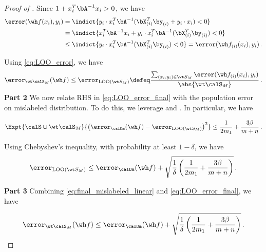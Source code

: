 \begin{proof}[Proof of ]
    Since $1 + x_i^T \bA^{-1} x_i > 0$, we have 
    \begin{align}
        \error(\wh f(x_i), y_i ) &= \indict{ y_i \cdot x_i^T \bA^{-1} (\bXX{i}^T\byy{i} + y_i \cdot x_i) < 0 } \\
        &= \indict{ x_i^T \bA^{-1} x_i +  y_i \cdot x_i^T \bA^{-1} (\bXX{i}^T\byy{i}) < 0 } \\
        &\le \indict{ y_i \cdot x_i^T \bA^{-1} (\bXX{i}^T\byy{i}) < 0 } = \error(\ff{i}(x_i), y_i ) \,.\label{eq:LOO_error}
    \end{align}

    Using \eqref{eq:LOO_error}, we have 
    \begin{align}
        \error_{\wt \calS_M } (\wh f) \le \error_{\text{LOO} (\wt S_M)} \defeq \frac{\sum_{(x_i, y_i) \in \wt S_M} \error(\ff{i}(x_i), y_i ) }{\abs{\wt \calS_M}}\label{eq:LOO_error_final} \,.
    \end{align}
    \textbf{Part 2 {}{}} We now relate RHS in \eqref{eq:LOO_error_final} 
    with the population error on mislabeled distribution. 
    To do this, we leverage  
    and . 
    In particular, we have 

    \begin{align}
        \Expt{\calS \cup \wt \calS_M }{ \left(\error_{\calDm}(\wh f) - \error_{\text{LOO} (\wt S_M)}\right)^2 } \le \frac{1}{2m_1} + \frac{3\beta}{m+n} \,.
    \end{align}

    Using Chebyshev's inequality, with probability at least $1-\delta$, we have 
    \begin{align}
        \error_{\text{LOO} (\wt S_M)} \le  \error_{\calDm}(\wh f)   + \sqrt{\frac{1}{\delta}\left(\frac{1}{2m_1} +\frac{3\beta}{m+n} \right)} \,. \label{eq:final_mislabeled_linear}
    \end{align}
    

    \textbf{Part 3 {}{}} Combining \eqref{eq:final_mislabeled_linear} and \eqref{eq:LOO_error_final}, we have 

    \begin{align}
        \error_{\wt \calS_M } (\wh f) \le \error_{\calDm}(\wh f)   + \sqrt{\frac{1}{\delta}\left(\frac{1}{2m_1} +\frac{3\beta}{m+n} \right)} \,. \label{eq:linear_parallel_lem1}
    \end{align}


\end{proof}
